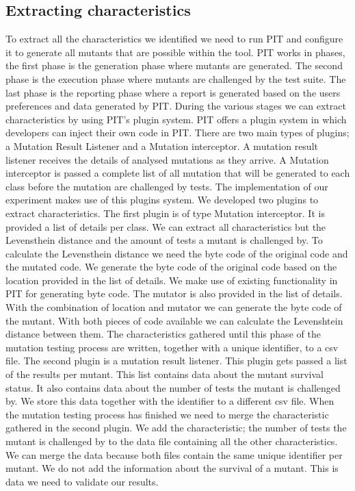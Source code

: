 \documentclass[../../main]{subfiles}
\begin{document}
\subsection{Extracting characteristics}
To extract all the characteristics we identified we need to run PIT and configure it to generate all mutants that are possible within the tool. 
PIT works in phases, the first phase is the generation phase where mutants are generated.
The second phase is the execution phase where mutants are challenged by the test suite.
The last phase is the reporting phase where a report is generated based on the users preferences and data generated by PIT.
During the various stages we can extract characteristics by using PIT's plugin system.
\newline
PIT offers a plugin system in which developers can inject their own code in PIT\cite{pitestPlugin}.
There are two main types of plugins; a Mutation Result Listener and a Mutation interceptor\cite{pitestPlugin}.
A mutation result listener receives the details of analysed mutations as they arrive\cite{pitestPlugin}.
A Mutation interceptor is passed a complete list of all mutation that will be generated to each class before the mutation are challenged by tests\cite{pitestPlugin}.
The implementation of our experiment makes use of this plugins system.
\newline
We developed two plugins to extract characteristics.
The first plugin is of type Mutation interceptor.
It is provided a list of details per class. 
We can extract all characteristics but the Levensthein distance and the amount of tests a mutant is challenged by.
To calculate the Levensthein distance we need the byte code of the original code and the mutated code.
We generate the byte code of the original code based on the location provided in the list of details.
We make use of existing functionality in PIT for generating byte code.
The mutator is also provided in the list of details.
With the combination of location and mutator we can generate the byte code of the mutant.
With both pieces of code available we can calculate the Levenshtein distance between them.
\newline
The characteristics gathered until this phase of the mutation testing process are written, together with a unique identifier, to a \acrshort{csv} file.
\newline
The second plugin is a mutation result listener. 
This plugin gets passed a list of the results per mutant.
This list contains data about the mutant survival status.
It also contains data about the number of tests the mutant is challenged by.
We store this data together with the identifier to a different \acrshort{csv} file.
\newline
When the mutation testing process has finished we need to merge the characteristic gathered in the second plugin.
We add the characteristic; the number of tests the mutant is challenged by to the data file containing all the other characteristics.
We can merge the data because both files contain the same unique identifier per mutant.
We do not add the information about the survival of a mutant.
This is data we need to validate our results. 
\end{document}
